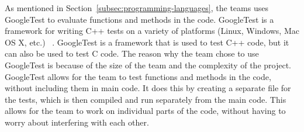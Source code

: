 As mentioned in Section~\ref{subsec:programming-languages}, the teams uses GoogleTest to evaluate functions and
methods in the code.
GoogleTest is a framework for writing C++ tests on a variety of platforms (Linux, Windows, Mac OS X, etc.)
~\cite{googletest}.
GoogleTest is a framework that is used to test C++ code, but it can also be used to test C code.
The reason why the team chose to use GoogleTest is because of the size of the team and the complexity of the project.
GoogleTest allows for the team to test functions and methods in the code, without including them in main code.
It does this by creating a separate file for the tests, which is then compiled and run separately from the main code.
This allows for the team to work on individual parts of the code, without having to worry about interfering with each
other.
